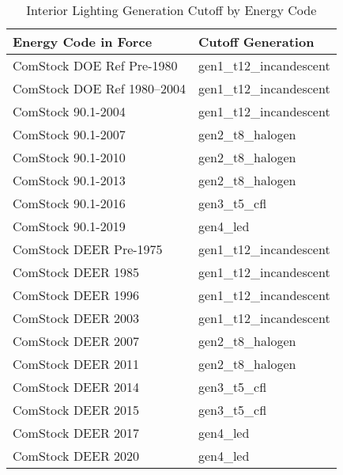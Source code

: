 \begin{table}
\small
\centering
\caption[Interior Lighting Generation Cutoff by Energy Code]{Interior Lighting Generation Cutoff by Energy Code}
\label{tab:ltg_cutoff_gen}
\begin{tabular}{|l|l|}
\hline
\textbf{Energy Code in Force} & \textbf{Cutoff Generation} \\ \hline
ComStock DOE   Ref Pre-1980     & gen1\_t12\_incandescent      \\ \hline
ComStock DOE   Ref 1980--2004    & gen1\_t12\_incandescent      \\ \hline
ComStock   90.1-2004            & gen1\_t12\_incandescent      \\ \hline
ComStock   90.1-2007            & gen2\_t8\_halogen            \\ \hline
ComStock   90.1-2010            & gen2\_t8\_halogen            \\ \hline
ComStock   90.1-2013            & gen2\_t8\_halogen            \\ \hline
ComStock   90.1-2016            & gen3\_t5\_cfl                \\ \hline
ComStock   90.1-2019            & gen4\_led                    \\ \hline
ComStock DEER   Pre-1975        & gen1\_t12\_incandescent      \\ \hline
ComStock DEER   1985            & gen1\_t12\_incandescent      \\ \hline
ComStock DEER   1996            & gen1\_t12\_incandescent      \\ \hline
ComStock DEER   2003            & gen1\_t12\_incandescent      \\ \hline
ComStock DEER   2007            & gen2\_t8\_halogen            \\ \hline
ComStock DEER   2011            & gen2\_t8\_halogen            \\ \hline
ComStock DEER   2014            & gen3\_t5\_cfl                \\ \hline
ComStock DEER   2015            & gen3\_t5\_cfl                \\ \hline
ComStock DEER   2017            & gen4\_led                    \\ \hline
ComStock DEER   2020            & gen4\_led                    \\ \hline
\end{tabular}
\end{table}